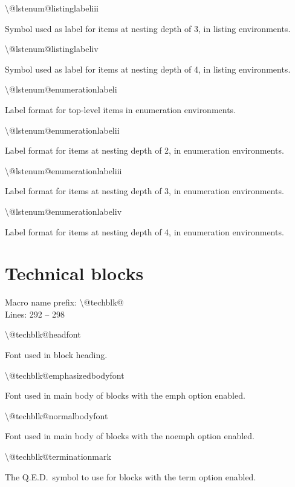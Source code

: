 \documentclass[twoside,openany]{thesis}
\begin{document}
\begin{listing}
\item   {\ttfamily\textbackslash @lstenum@listinglabeliii}

        Symbol used as label for items at nesting depth of 3, in {\ttfamily listing} environments.

\item   {\ttfamily\textbackslash @lstenum@listinglabeliv}

        Symbol used as label for items at nesting depth of 4, in {\ttfamily listing} environments.

\item   {\ttfamily\textbackslash @lstenum@enumerationlabeli}

        Label format for top-level items in {\ttfamily enumeration} environments.

\item   {\ttfamily\textbackslash @lstenum@enumerationlabelii}

        Label format for items at nesting depth of 2, in {\ttfamily enumeration} environments.

\item   {\ttfamily\textbackslash @lstenum@enumerationlabeliii}

        Label format for items at nesting depth of 3, in {\ttfamily enumeration} environments.

\item   {\ttfamily\textbackslash @lstenum@enumerationlabeliv}

        Label format for items at nesting depth of 4, in {\ttfamily enumeration} environments.

\end{listing}

\section{Technical blocks}\label{sec:Technical blocks}

Macro name prefix: {\ttfamily\textbackslash @techblk@}\\
Lines: 292 -- 298

\begin{listing}

\item   {\ttfamily\textbackslash @techblk@headfont}

        Font used in block heading.

\item   {\ttfamily\textbackslash @techblk@emphasizedbodyfont}

        Font used in main body of blocks with the {\ttfamily emph} option enabled.

\item   {\ttfamily\textbackslash @techblk@normalbodyfont}

        Font used in main body of blocks with the {\ttfamily noemph} option enabled.

\item   {\ttfamily\textbackslash @techblk@terminationmark}

        The Q.E.D.\ symbol to use for blocks with the {\ttfamily term} option enabled.

\end{listing}
\end{document}
